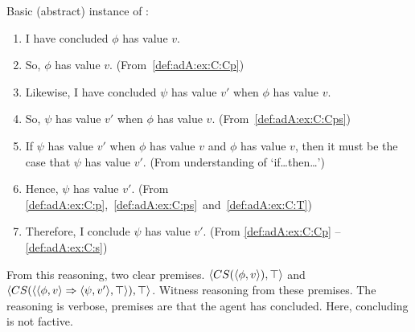 \begin{note}
  Basic (abstract) instance of \adA{}:

  {
    \small
    \begin{enumerate}[label=\arabic*., ref=\arabic*]
    \item\label{def:adA:ex:C:Cp} I have concluded \(\phi\) has value \(v\).
    \item\label{def:adA:ex:C:p} So, \(\phi\) has value \(v\). \hfill(From~\ref{def:adA:ex:C:Cp})
    \item\label{def:adA:ex:C:Cps} Likewise, I have concluded \(\psi\) has value \(v'\) when \(\phi\) has value \(v\).
    \item\label{def:adA:ex:C:ps} So, \(\psi\) has value \(v'\) when \(\phi\) has value \(v\). \hfill(From~\ref{def:adA:ex:C:Cps})
    \item\label{def:adA:ex:C:T} If \(\psi\) has value \(v'\) when \(\phi\) has value \(v\) and \(\phi\) has value \(v\), then it must be the case that \(\psi\) has value \(v'\). \hfill (From understanding of `if\dots then\dots')
    \item\label{def:adA:ex:C:s} Hence, \(\psi\) has value \(v'\).\newline
      \mbox{}\hfill (From \ref{def:adA:ex:C:p},~\ref{def:adA:ex:C:ps}~and~\ref{def:adA:ex:C:T})
    \item Therefore, I conclude \(\psi\) has value \(v'\). \hfill (From \ref{def:adA:ex:C:Cp} -- \ref{def:adA:ex:C:s})
    \end{enumerate}
  }
  From this reasoning, two clear premises.
  \(\langle CS(\langle \phi, v \rangle), \top \rangle\) and \(\langle CS(\langle \langle \phi, v \rangle \Rightarrow \langle \psi, v' \rangle, \top \rangle), \top \rangle\).
  Witness reasoning from these premises.
  The reasoning is verbose, premises are that the agent has concluded.
  Here, concluding is not factive.


\end{note}
